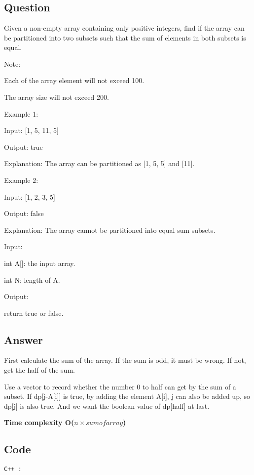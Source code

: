 \newpage
\section{}
\subsection{Question}
Given a non-empty array containing only positive integers, find if the array can be partitioned into two subsets such that the sum of elements in both subsets is equal.

Note:

Each of the array element will not exceed 100.

The array size will not exceed 200.

Example 1:

Input: [1, 5, 11, 5]

Output: true

Explanation: The array can be partitioned as [1, 5, 5] and [11].

Example 2:

Input: [1, 2, 3, 5]

Output: false

Explanation: The array cannot be partitioned into equal sum subsets.

Input:

int A[]: the input array.

int N: length of A.

Output:

return true or false.

\subsection{Answer}

First calculate the sum of the array. If the sum is odd, it must be wrong. If not, get the half of the sum. 

Use a vector to record whether the number 0 to half can get  by the sum of a subset.
If dp[j-A[i]] is true, by adding the element A[i], j can also be added up, so dp[j] is also true.
And we want the boolean value of dp[half] at last. 


\textbf{\color{red}Time complexity O($n\times sum of array$)}
\newpage
\subsection{Code}
\texttt{C++ :}


